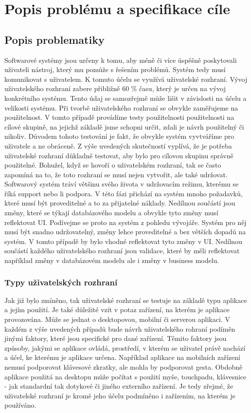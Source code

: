 \chapter{Popis problému a specifikace cíle}
\section{Popis problematiky}
Softwarové systémy jsou určeny k tomu, aby méně či více úspěšně poskytovali uživateli nástroj, který mu pomůže s řešením problémů. Systém tedy musí komunikovat s uživatelem. K tomuto účelu se využívá uživatelské rozhraní. Vývoj uživatelského rozhraní zabere přibližně 60 \% času, který je určen na vývoj konkrétního systému. Tento údaj se samozřejmě může lišit v závislosti na účelu a velikosti systému. Při tvorbě uživatelského rozhraní se obvykle zaměřujeme na použitelnost. V tomto případě provádíme testy použitelnosti použitelnosti na cílové skupině, na jejichž základě jsme schopni určit, zdali je návrh použitelný či nikoliv. Důvodem tohoto testování je fakt, že obvykle systém vyvtváříme pro uživatele a ne obráceně. Z výše uvedených skutečností vyplívá, že je potřeba uživatelské rozhraní důkladně testovat, aby bylo pro cílovou skupinu správně použitelné. Bohužel, když se hovoří o uživatelském rozhraní, tak se často zapomíná na to, že toto rozhraní se musí nejen vytvořit, ale také udržovat. Softwarový systém tráví většinu svého života v udržovacím režimu, kterému se říká support nebo li podpora. V této fázi přichází na systém mnoho požadavků, které musí být proveditelné a to za přijatelné náklady. Nedílnou součástí jsou změny, které se týkají databázového modelu a obvykle tyto změny musí reflektovat UI. Podívejme se proto na systém z pohledu vývojáře. Systém pro něj musí být snadno udržovatelný, změny lehce proveditelné a bez větších dopadů na systém. V tomto případě by bylo vhodné reflektovat tyto změny v UI. Nedílnou součástí každého uživatelského rozhraní jsou validace, které by měli reflektovat například změny v databázovém modelu ale i změny v business modelu.
\subsection{Typy uživatelských rozhraní}
Jak již bylo zmíněno, tak uživatelské rozhraní se testuje na základě typu aplikace a jejím použití. Je také důležité vzít v potaz zařízení, na kterém je aplikace provozována. Může se jednat o desktopovou, mobilní či serverou aplikaci. V každém z výše uvedených případů bude návrh uživatelského rohraní podíměn jinými faktory, které jsou specifické pro dané zařízení. Těmito faktory jsou způsoby, jakými se aplikace ovládá, prostředí, v kterém se uživatel právě nachází a účel, ke kterému je aplikace určena. Například aplikace na mobilních zařízení nemusí podporovat klávesové zkratky, ale mohla by podporovat gesta. Obdobně aplikace použitá na desktopu může počítat s použití myše, touchpadu, klávesnice - jak standardní tak dotykové či jiného externího zařízení. Je tedy zřejmé, že uživatelské rozhraní je kromě jeho účelu podmíněno i zařízením, na kterém je používáno.

